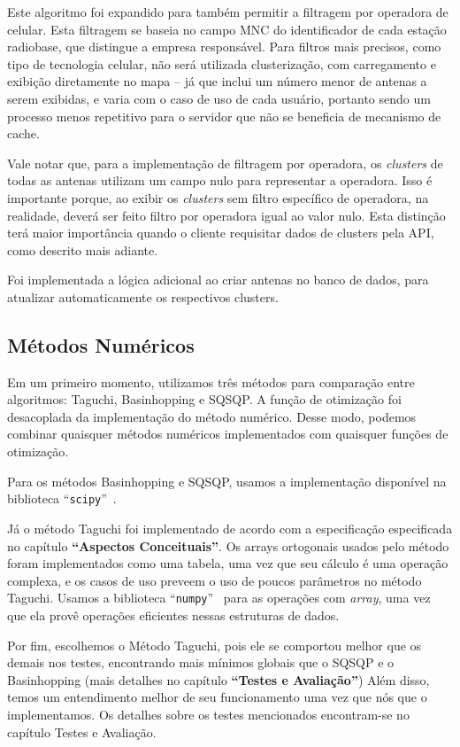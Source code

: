 \documentclass[]{politex}
\begin{document}
Este algoritmo foi expandido para também permitir a filtragem por operadora de
celular. Esta filtragem se baseia no campo MNC do identificador de cada estação
radiobase, que distingue a empresa responsável. Para filtros mais precisos, como
tipo de tecnologia celular, não será utilizada clusterização, com carregamento e
exibição diretamente no mapa -- já que inclui um número menor de antenas a serem
exibidas, e varia com o caso de uso de cada usuário, portanto sendo um processo
menos repetitivo para o servidor que não se beneficia de mecanismo de cache.

Vale notar que, para a implementação de filtragem por operadora, os \textit{clusters}
de todas as antenas utilizam um campo nulo para representar a operadora. Isso é
importante porque, ao exibir os \textit{clusters} sem filtro específico de operadora, na
realidade, deverá ser feito filtro por operadora igual ao valor nulo. Esta
distinção terá maior importância quando o cliente requisitar dados de clusters
pela API, como descrito mais adiante.

Foi implementada a lógica adicional ao criar antenas no banco de dados, para
atualizar automaticamente os respectivos clusters.

\subsection{Métodos Numéricos}

Em um primeiro momento, utilizamos três métodos para comparação entre
algoritmos: Taguchi, Basinhopping e SQSQP. A função de otimização foi
desacoplada da implementação do método numérico. Desse modo, podemos combinar
quaisquer métodos numéricos implementados com quaisquer funções de otimização.

Para os métodos Basinhopping e SQSQP, usamos a implementação disponível na
biblioteca ``\texttt{scipy}''~\cite{scipy}.

Já o método Taguchi foi implementado de acordo com a especificação especificada
no capítulo \textbf{``Aspectos Conceituais''}. Os arrays ortogonais usados pelo
método foram implementados como uma tabela, uma vez que seu cálculo é uma
operação complexa, e os casos de uso preveem o uso de poucos parâmetros no
método Taguchi. Usamos a biblioteca ``\texttt{numpy}''~\cite{numpy} para as operações com
\textit{array}, uma vez que ela provê operações eficientes nessas estruturas de dados.

Por fim, escolhemos o Método Taguchi, pois ele se comportou melhor que os demais
nos testes, encontrando mais mínimos globais que o SQSQP e o Basinhopping (mais
detalhes no capítulo \textbf{``Testes e Avaliação''})
Além disso, temos um entendimento melhor de seu funcionamento uma vez que nós
que o implementamos. Os detalhes sobre os testes mencionados
encontram-se no capítulo Testes e Avaliação.
\end{document}

